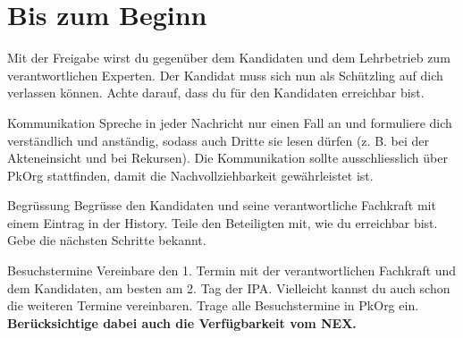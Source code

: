\section{Bis zum Beginn}
Mit der Freigabe wirst du gegenüber dem Kandidaten und dem Lehrbetrieb zum verantwortlichen Experten. Der Kandidat muss sich nun als Schützling auf dich verlassen können. Achte darauf, dass du für den Kandidaten erreichbar bist.

\begin{taskitemwithoutcomment}{Kommunikation}
  Spreche in jeder Nachricht nur einen Fall an und formuliere dich verständlich und anständig, sodass auch Dritte sie lesen dürfen (z. B. bei der Akteneinsicht und bei Rekursen).
  Die Kommunikation sollte ausschliesslich über PkOrg stattfinden, damit die Nachvollziehbarkeit gewährleistet ist.
\end{taskitemwithoutcomment}
\begin{taskitemwithoutcomment}{Begrüssung}
  Begrüsse den Kandidaten und seine verantwortliche Fachkraft mit einem Eintrag in der History. Teile den Beteiligten mit, wie du erreichbar bist. Gebe die nächsten Schritte bekannt.
\end{taskitemwithoutcomment}
\begin{taskitem}{Besuchstermine}
  Vereinbare den 1. Termin mit der verantwortlichen Fachkraft und dem Kandidaten, am besten am 2. Tag der IPA. Vielleicht kannst du auch schon die weiteren Termine vereinbaren. Trage alle Besuchstermine in PkOrg ein. \textbf{Berücksichtige dabei auch die Verfügbarkeit vom NEX.}
\end{taskitem}

